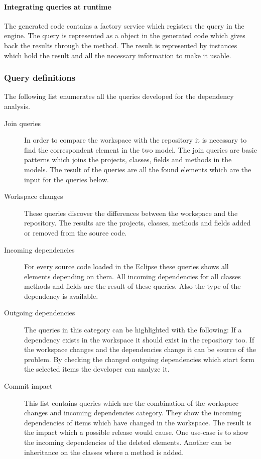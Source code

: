 \paragraph{Integrating queries at runtime}  
The generated code contains a factory service which registers the query in the
engine. The query is represented as a  object in the generated
code which gives back the results through the 
method. The result is represented by  instances which hold the result 
and all the necessary information to make it usable.

\subsubsection{Query definitions}
The following list enumerates all the  queries developed for the dependency
analysis.
\begin{description}	
\item[Join queries]
In order to compare the workspace with the repository it is necessary to find 
the correspondent element in the two model. The join queries are basic patterns 
which joins the projects, classes, fields and methods in the models. The result
of the queries are all the found elements which are the input for the queries 
below. 
\item[Workspace changes] These queries discover the differences between the 
workspace and the repository. The results are the projects, classes, methods
and fields added or removed from the source code.   
\item[Incoming dependencies] For every source code loaded in the Eclipse these
queries shows all elements depending  on them. All incoming dependencies for 
all classes methods and fields are the result of these queries. Also the type
of the dependency is available. 
\item[Outgoing dependencies] The queries in this category can be highlighted 
with the following: If a dependency exists in the workspace it should
exist in the repository too. If the workspace changes and the dependencies change
it can be source of the problem.  By checking the changed outgoing dependencies
which start form the selected items the developer can analyze it.
\item[Commit impact] This list contains queries which are the combination of 
the workspace changes and incoming dependencies category. They show the incoming
dependencies of items which have changed in the workspace. The result is the
impact which a possible release would cause.  One use-case is to show the
incoming dependencies of the deleted elements. Another can be inheritance on
the classes where a method is added.
\end{description}


